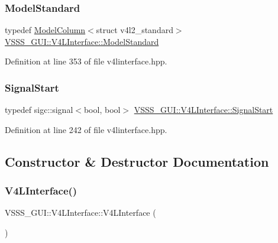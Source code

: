 \subsubsection{\texorpdfstring{Model\+Standard}{ModelStandard}}
{\footnotesize\ttfamily typedef \hyperlink{class_v_s_s_s___g_u_i_1_1_v4_l_interface_1_1_model_column}{Model\+Column}$<$struct v4l2\+\_\+standard$>$ \hyperlink{class_v_s_s_s___g_u_i_1_1_v4_l_interface_a85b346fe61c675eb9a028a2ca9015dca}{V\+S\+S\+S\+\_\+\+G\+U\+I\+::\+V4\+L\+Interface\+::\+Model\+Standard}\hspace{0.3cm}{\ttfamily [private]}}



Definition at line 353 of file v4linterface.\+hpp.

\mbox{\label{class_v_s_s_s___g_u_i_1_1_v4_l_interface_aaa97121c9564dbb8c0717725a795ed15}} 
\subsubsection{\texorpdfstring{Signal\+Start}{SignalStart}}
{\footnotesize\ttfamily typedef sigc\+::signal$<$bool, bool$>$ \hyperlink{class_v_s_s_s___g_u_i_1_1_v4_l_interface_aaa97121c9564dbb8c0717725a795ed15}{V\+S\+S\+S\+\_\+\+G\+U\+I\+::\+V4\+L\+Interface\+::\+Signal\+Start}}



Definition at line 242 of file v4linterface.\+hpp.



\subsection{Constructor \& Destructor Documentation}
\mbox{\label{class_v_s_s_s___g_u_i_1_1_v4_l_interface_a8fafd828eacc6d5480649fa9fddc7ee4}} 
\subsubsection{\texorpdfstring{V4\+L\+Interface()}{V4LInterface()}}
{\footnotesize\ttfamily V\+S\+S\+S\+\_\+\+G\+U\+I\+::\+V4\+L\+Interface\+::\+V4\+L\+Interface (\begin{DoxyParamCaption}{ }\end{DoxyParamCaption})}



